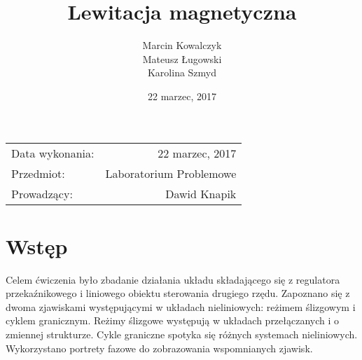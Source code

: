 \documentclass[11pt,a4paper]{article}
\title{\textbf{Lewitacja magnetyczna}} %
\author{Marcin Kowalczyk \\ Mateusz Ługowski \\ Karolina Szmyd} %
\date{22 marzec, 2017} %
\begin{document}
\maketitle %

\begin{center}
\begin{tabular}{l r}
Data wykonania: & 22 marzec, 2017 \\ %
Przedmiot: & Laboratorium Problemowe \\
Prowadzący: & Dawid Knapik %
\end{tabular}
\end{center}

\section{Wstęp}
Celem ćwiczenia było zbadanie działania układu składającego się z regulatora przekaźnikowego i liniowego obiektu sterowania drugiego rzędu. Zapoznano się z dwoma zjawiskami występującymi w układach nieliniowych: reżimem ślizgowym i cyklem granicznym. Reżimy ślizgowe występują w układach przełączanych i o zmiennej strukturze. Cykle graniczne spotyka się różnych systemach nieliniowych. Wykorzystano portrety fazowe do zobrazowania wspomnianych zjawisk.
\end{document}
